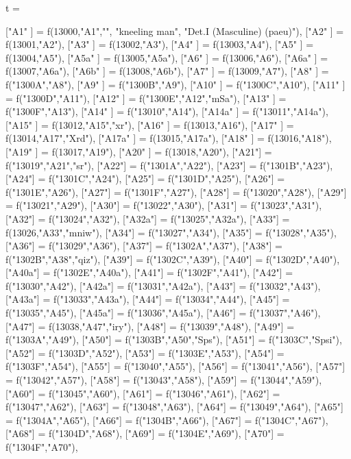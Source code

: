 \documentclass{article}
\begin{document}
\begin{luacode*}
t ={
   ["A1" 	]      =   f(13000,"A1","",
                         "kneeling man",
                          "Det.I (Masculine) (paeu)"),
   ["A2" 	] 		=  f(13001,"A2"),
   ["A3" 	] 		=  f(13002,"A3"),
   ["A4" 	] 		=  f(13003,"A4"),
   ["A5" 	]		=  f(13004,"A5"), 
   ["A5a"	] 		=  f(13005,"A5a"),
   ["A6"	]		=  f(13006,"A6"),
   ["A6a"	]		=  f(13007,"A6a"),
   ["A6b"	]		=  f(13008,"A6b"),
   ["A7"	] 		=  f(13009,"A7"),
   ["A8"	] 		=  f("1300A","A8"),
   ["A9" 	] 		=  f("1300B","A9"),
   ["A10"   ] 		=  f("1300C","A10"),
   ["A11"   ] 		=  f("1300D","A11"),
   ["A12"   ] 		=  f("1300E","A12","mSa"),
   ["A13"   ] 		=  f("1300F","A13"),
   ["A14"   ] 		=  f("13010","A14"),
   ["A14a"  ] 		=  f("13011","A14a"),
   ["A15"   ]		=  f(13012,"A15","xr"),
   ["A16"   ] 		=  f(13013,"A16"),
   ["A17"   ] 		=  f(13014,"A17","Xrd"),
   ["A17a"  ] 		=  f(13015,"A17a"),
   ["A18"   ] 		=  f(13016,"A18"),
   ["A19"   ] 		=  f(13017,"A19"),
   ["A20"   ] 		=  f(13018,"A20"),
  	["A21"] 		= f("13019","A21","sr"),
  	["A22"] 		= f("1301A","A22"),
  	["A23"] 		= f("1301B","A23"),
  	["A24"] 		= f("1301C","A24"),
  	["A25"] 		= f("1301D","A25"),
  	["A26"] 		= f("1301E","A26"),
  	["A27"] 		= f("1301F","A27"),
  	["A28"] 		= f("13020","A28"),
  	["A29"] 		= f("13021","A29"),
  	["A30"] 		= f("13022","A30"),
  	["A31"] 		= f("13023","A31"),
  	["A32"] 		= f("13024","A32"),
 	["A32a"] 		= f("13025","A32a"),
  	["A33"] 		= f(13026,"A33","mniw"),
	["A34"] 		= f("13027","A34"),
	["A35"] 		= f("13028","A35"),
	["A36"] 		= f("13029","A36"),
	["A37"] 		= f("1302A","A37"),
	["A38"] 		= f("1302B","A38","qiz"),
	["A39"] 		= f("1302C","A39"),
	["A40"] 		= f("1302D","A40"),
	["A40a"] 		= f("1302E","A40a"),
	["A41"] 		= f("1302F","A41"),
	["A42"] 		= f("13030","A42"),
	["A42a"] 		= f("13031","A42a"),
	["A43"] 		= f("13032","A43"),
	["A43a"] 		= f("13033","A43a"),
	["A44"] 		= f("13034","A44"),
	["A45"] 		= f("13035","A45"),
	["A45a"] 		= f("13036","A45a"),
	["A46"] 		= f("13037","A46"),
  	["A47"] 		= f(13038,"A47","iry"),
	["A48"] 		= f("13039","A48"),
	["A49"] 		= f("1303A","A49"),
  	["A50"] 		= f("1303B","A50","Sps"),
  	["A51"] 		= f("1303C","Spsi"),
	["A52"] 		= f("1303D","A52"),
	["A53"] 		= f("1303E","A53"),
	["A54"] 		= f("1303F","A54"),
	["A55"] 		= f("13040","A55"),
	["A56"] 		= f("13041","A56"),
	["A57"] 		= f("13042","A57"),
	["A58"] 		= f("13043","A58"),
	["A59"] 		= f("13044","A59"),
	["A60"] 		= f("13045","A60"),
	["A61"] 		= f("13046","A61"),
	["A62"] 		= f("13047","A62"),
	["A63"] 		= f("13048","A63"),
	["A64"] 		= f("13049","A64"),
	["A65"] 		= f("1304A","A65"),
	["A66"] 		= f("1304B","A66"),
	["A67"] 		= f("1304C","A67"),
	["A68"] 		= f("1304D","A68"),
	["A69"] 		= f("1304E","A69"),
	["A70"] 		= f("1304F","A70"),

}
\end{luacode*}
\end{document}
